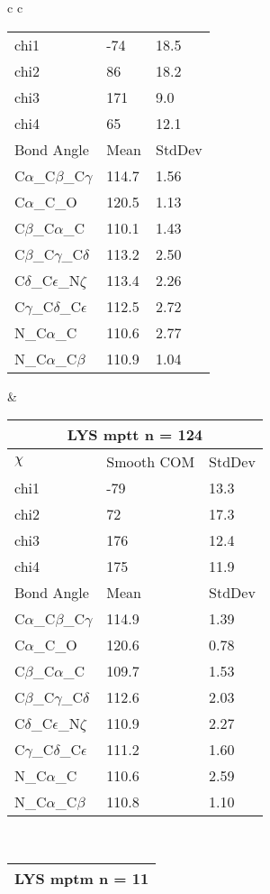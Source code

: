 \begin{longtable}{ c c }
\begin{tabular}{ l l l }
  chi1 & -74 & 18.5 \\ 
  chi2 & 86 & 18.2 \\ 
  chi3 & 171 & 9.0 \\ 
  chi4 & 65 & 12.1 \\ \midrule
  Bond Angle   & Mean     & StdDev \\ \midrule
  C$\alpha$\_C$\beta$\_C$\gamma$ & 114.7 & 1.56\\
  C$\alpha$\_C\_O & 120.5 & 1.13\\
  C$\beta$\_C$\alpha$\_C & 110.1 & 1.43\\
  C$\beta$\_C$\gamma$\_C$\delta$ & 113.2 & 2.50\\
  C$\delta$\_C$\epsilon$\_N$\zeta$ & 113.4 & 2.26\\
  C$\gamma$\_C$\delta$\_C$\epsilon$ & 112.5 & 2.72\\
  N\_C$\alpha$\_C & 110.6 & 2.77\\
  N\_C$\alpha$\_C$\beta$ & 110.9 & 1.04\\
  \bottomrule
  \end{tabular}
  &
  \begin{tabular}{ l l l }
  \toprule
  \multicolumn{3}{c}{LYS \textbf{mptt} n = 124} \\ \toprule
  $\chi$       & Smooth COM & StdDev \\ \midrule
  chi1 & -79 & 13.3 \\ 
  chi2 & 72 & 17.3 \\ 
  chi3 & 176 & 12.4 \\ 
  chi4 & 175 & 11.9 \\ \midrule
  Bond Angle   & Mean     & StdDev \\ \midrule
  C$\alpha$\_C$\beta$\_C$\gamma$ & 114.9 & 1.39\\
  C$\alpha$\_C\_O & 120.6 & 0.78\\
  C$\beta$\_C$\alpha$\_C & 109.7 & 1.53\\
  C$\beta$\_C$\gamma$\_C$\delta$ & 112.6 & 2.03\\
  C$\delta$\_C$\epsilon$\_N$\zeta$ & 110.9 & 2.27\\
  C$\gamma$\_C$\delta$\_C$\epsilon$ & 111.2 & 1.60\\
  N\_C$\alpha$\_C & 110.6 & 2.59\\
  N\_C$\alpha$\_C$\beta$ & 110.8 & 1.10\\
  \bottomrule
  \end{tabular}
  \\
  \begin{tabular}{ l l l }
  \toprule
  \multicolumn{3}{c}{LYS \textbf{mptm} n = 11} \\ \toprule

\end{tabular}
\end{longtable}
